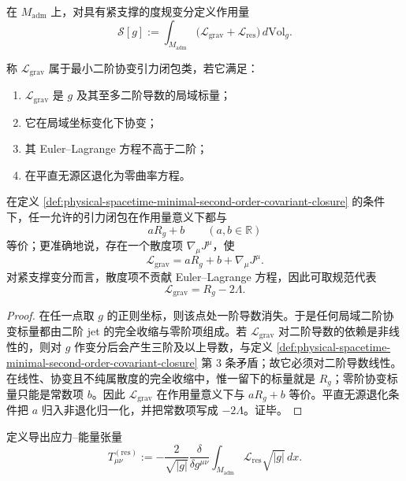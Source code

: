 \begin{definition}[全局作用量]\label{def:physical-spacetime-global-action}
在 \(M_{\mathrm{adm}}\) 上，对具有紧支撑的度规变分定义作用量
\[
\mathcal S[g]
:=
\int_{M_{\mathrm{adm}}}\bigl(\mathcal L_{\mathrm{grav}}+\mathcal L_{\mathrm{res}}\bigr)\,d\mathrm{Vol}_g.
\]
\end{definition}

\begin{definition}[最小二阶协变引力闭包类]\label{def:physical-spacetime-minimal-second-order-covariant-closure}
称 \(\mathcal L_{\mathrm{grav}}\) 属于最小二阶协变引力闭包类，若它满足：
\begin{enumerate}
  \item \(\mathcal L_{\mathrm{grav}}\) 是 \(g\) 及其至多二阶导数的局域标量；
  \item 它在局域坐标变化下协变；
  \item 其 Euler--Lagrange 方程不高于二阶；
  \item 在平直无源区退化为零曲率方程。
\end{enumerate}
\end{definition}

\begin{theorem}[最小引力标量的唯一性]\label{thm:physical-spacetime-gravitational-scalar-uniqueness}
在定义 \ref{def:physical-spacetime-minimal-second-order-covariant-closure} 的条件下，任一允许的引力闭包在作用量意义下都与
\[
aR_g+b
\qquad (a,b\in\mathbb R)
\]
等价；更准确地说，存在一个散度项 \(\nabla_\mu J^\mu\)，使
\[
\mathcal L_{\mathrm{grav}}=aR_g+b+\nabla_\mu J^\mu.
\]
对紧支撑变分而言，散度项不贡献 Euler--Lagrange 方程，因此可取规范代表
\[
\mathcal L_{\mathrm{grav}}=R_g-2\Lambda.
\]
\end{theorem}
\begin{proof}
在任一点取 \(g\) 的正则坐标，则该点处一阶导数消失。于是任何局域二阶协变标量都由二阶 jet 的完全收缩与零阶项组成。若 \(\mathcal L_{\mathrm{grav}}\) 对二阶导数的依赖是非线性的，则对 \(g\) 作变分后会产生三阶及以上导数，与定义 \ref{def:physical-spacetime-minimal-second-order-covariant-closure} 第 \(3\) 条矛盾；故它必须对二阶导数线性。在线性、协变且不纯属散度的完全收缩中，惟一留下的标量就是 \(R_g\)；零阶协变标量只能是常数项 \(b\)。因此 \(\mathcal L_{\mathrm{grav}}\) 在作用量意义下与 \(aR_g+b\) 等价。平直无源退化条件把 \(a\) 归入非退化归一化，并把常数项写成 \(-2\Lambda\)。证毕。
\end{proof}

\begin{definition}\label{def:physical-spacetime-derived-stress-energy}
定义导出应力--能量张量
\[
T^{(\mathrm{res})}_{\mu\nu}
:=
-\frac{2}{\sqrt{\lvert g\rvert}}
\frac{\delta}{\delta g^{\mu\nu}}
\int_{M_{\mathrm{adm}}}\mathcal L_{\mathrm{res}}\sqrt{\lvert g\rvert}\,dx.
\]
\end{definition}

